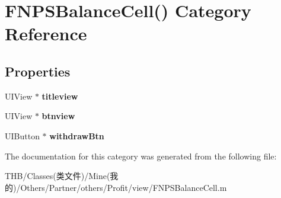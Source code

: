 \hypertarget{category_f_n_p_s_balance_cell_07_08}{}\section{F\+N\+P\+S\+Balance\+Cell() Category Reference}
\label{category_f_n_p_s_balance_cell_07_08}
\subsection*{Properties}
\begin{DoxyCompactItemize}
\item 
\mbox{\label{category_f_n_p_s_balance_cell_07_08_ab4211a262fae21346f00bb9a0e115ff7}} 
U\+I\+View $\ast$ {\bfseries titleview}
\item 
\mbox{\label{category_f_n_p_s_balance_cell_07_08_af994c1f0885548d6b5d7d7bae4a575b9}} 
U\+I\+View $\ast$ {\bfseries btnview}
\item 
\mbox{\label{category_f_n_p_s_balance_cell_07_08_a85c8b277cdd53ce5b0ce4540731fbe8b}} 
U\+I\+Button $\ast$ {\bfseries withdraw\+Btn}
\end{DoxyCompactItemize}


The documentation for this category was generated from the following file\+:\begin{DoxyCompactItemize}
\item 
T\+H\+B/\+Classes(类文件)/\+Mine(我的)/\+Others/\+Partner/others/\+Profit/view/F\+N\+P\+S\+Balance\+Cell.\+m\end{DoxyCompactItemize}
